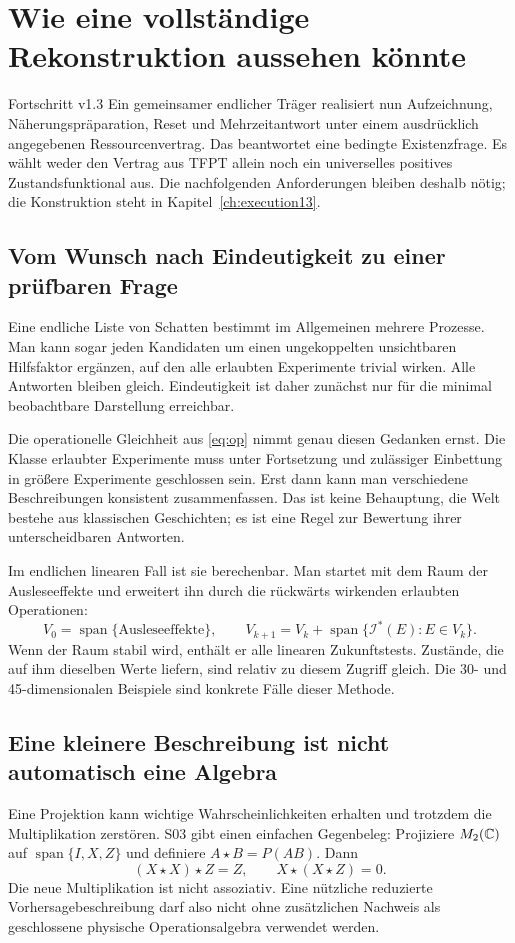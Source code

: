 \chapter{Wie eine vollständige Rekonstruktion aussehen könnte}
\label{ch:recon}
\begin{bild}{Fortschritt v1.3}
Ein gemeinsamer endlicher Träger realisiert nun Aufzeichnung, Näherungspräparation, Reset und Mehrzeitantwort unter einem ausdrücklich angegebenen Ressourcenvertrag. Das beantwortet eine bedingte Existenzfrage. Es wählt weder den Vertrag aus TFPT allein noch ein universelles positives Zustandsfunktional aus. Die nachfolgenden Anforderungen bleiben deshalb nötig; die Konstruktion steht in Kapitel~\ref{ch:execution13}.
\end{bild}
\section{Vom Wunsch nach Eindeutigkeit zu einer prüfbaren Frage}
Eine endliche Liste von Schatten bestimmt im Allgemeinen mehrere Prozesse. Man kann sogar jeden Kandidaten um einen ungekoppelten unsichtbaren Hilfsfaktor ergänzen, auf den alle erlaubten Experimente trivial wirken. Alle Antworten bleiben gleich. Eindeutigkeit ist daher zunächst nur für die minimal beobachtbare Darstellung erreichbar.

Die operationelle Gleichheit aus \eqref{eq:op} nimmt genau diesen Gedanken ernst. Die Klasse erlaubter Experimente muss unter Fortsetzung und zulässiger Einbettung in größere Experimente geschlossen sein. Erst dann kann man verschiedene Beschreibungen konsistent zusammenfassen. Das ist keine Behauptung, die Welt bestehe aus klassischen Geschichten; es ist eine Regel zur Bewertung ihrer unterscheidbaren Antworten.

Im endlichen linearen Fall ist sie berechenbar. Man startet mit dem Raum der Ausleseeffekte und erweitert ihn durch die rückwärts wirkenden erlaubten Operationen:
\begin{equation}
V_0=\operatorname{span}\{\text{Ausleseeffekte}\},\qquad
V_{k+1}=V_k+\operatorname{span}\{\mathcal I^*(E):E\in V_k\}.
\end{equation}
Wenn der Raum stabil wird, enthält er alle linearen Zukunftstests. Zustände, die auf ihm dieselben Werte liefern, sind relativ zu diesem Zugriff gleich. Die 30- und 45-dimensionalen Beispiele sind konkrete Fälle dieser Methode. 

\section{Eine kleinere Beschreibung ist nicht automatisch eine Algebra}
Eine Projektion kann wichtige Wahrscheinlichkeiten erhalten und trotzdem die Multiplikation zerstören. S03 gibt einen einfachen Gegenbeleg: Projiziere $M_2(\mathbb C)$ auf $\operatorname{span}\{I,X,Z\}$ und definiere $A\star B=P(AB)$. Dann
\begin{equation}
(X\star X)\star Z=Z,\qquad X\star(X\star Z)=0.
\end{equation}
Die neue Multiplikation ist nicht assoziativ. Eine nützliche reduzierte Vorhersagebeschreibung darf also nicht ohne zusätzlichen Nachweis als geschlossene physische Operationsalgebra verwendet werden.


